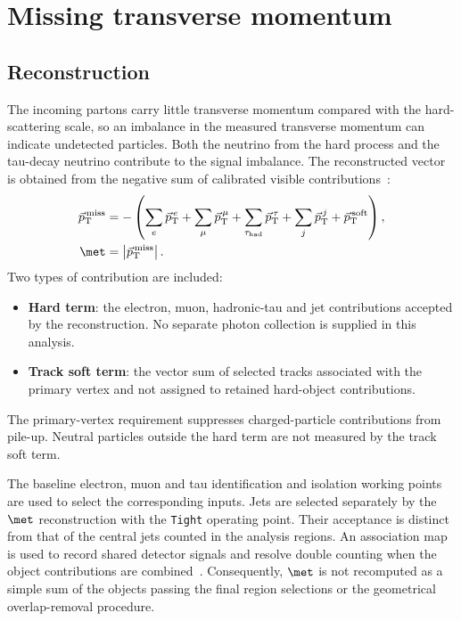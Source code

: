 \section{Missing transverse momentum}
\label{sec:ch6_met}

\subsection{Reconstruction}

The incoming partons carry little transverse momentum compared with the hard-scattering scale, so an imbalance in the measured transverse momentum can indicate undetected particles.
Both the neutrino from the hard process and the tau-decay neutrino contribute to the signal imbalance.
The reconstructed vector is obtained from the negative sum of calibrated visible contributions~\cite{ATLAS2025METPerformance}:
\begin{align}
    \vec p_{\mathrm{T}}^{\,\mathrm{miss}}
    &=-\left(
    \sum_e\vec p_{\mathrm{T}}^{\,e}
    +\sum_\mu\vec p_{\mathrm{T}}^{\,\mu}
    +\sum_{\tau_{\mathrm{had}}}\vec p_{\mathrm{T}}^{\,\tau}
    +\sum_j\vec p_{\mathrm{T}}^{\,j}
    +\vec p_{\mathrm{T}}^{\,\mathrm{soft}}
    \right),
    \label{eq:ch6_met_vector}\\
    \met&=\left|\vec p_{\mathrm{T}}^{\,\mathrm{miss}}\right|.
    \label{eq:ch6_met_magnitude}
\end{align}
Two types of contribution are included:
\begin{itemize}
    \item \textbf{Hard term}: the electron, muon, hadronic-tau and jet contributions accepted by the reconstruction. No separate photon collection is supplied in this analysis.
    \item \textbf{Track soft term}: the vector sum of selected tracks associated with the primary vertex and not assigned to retained hard-object contributions.
\end{itemize}
The primary-vertex requirement suppresses charged-particle contributions from pile-up.
Neutral particles outside the hard term are not measured by the track soft term.

The baseline electron, muon and tau identification and isolation working points are used to select the corresponding inputs.
Jets are selected separately by the $\met$ reconstruction with the \texttt{Tight} operating point.
Their acceptance is distinct from that of the central jets counted in the analysis regions.
An association map is used to record shared detector signals and resolve double counting when the object contributions are combined~\cite{ATLAS2025METPerformance}.
Consequently, $\met$ is not recomputed as a simple sum of the objects passing the final region selections or the geometrical overlap-removal procedure.

